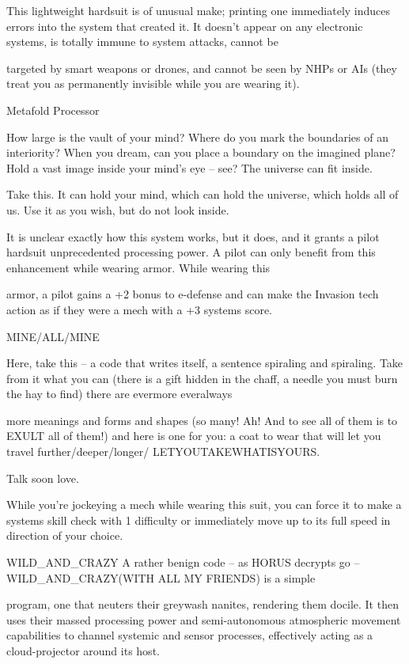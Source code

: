 This lightweight hardsuit is of unusual make; printing one immediately induces errors into the system that
created it. It doesn't appear on any electronic systems, is totally immune to system attacks, cannot be

targeted by smart weapons or drones, and cannot be seen by NHPs or AIs (they treat you as permanently
invisible while you are wearing it).


Metafold Processor




How large is the vault of your mind? Where do you mark the boundaries of an interiority? When you dream,
can you place a boundary on the imagined plane? Hold a vast image inside your mind's eye -- see? The
universe can fit inside.

Take this. It can hold your mind, which can hold the universe, which holds all of us. Use it as you wish, but
do not look inside.

It is unclear exactly how this system works, but it does, and it grants a pilot hardsuit unprecedented
processing power. A pilot can only benefit from this enhancement while wearing armor. While wearing this

armor, a pilot gains a +2 bonus to e-defense and can make the Invasion tech action as if they were a mech
with a +3 systems score.


MINE/ALL/MINE

Here, take this -- a code that writes itself, a sentence spiraling and spiraling. Take from it what you can
(there is a gift hidden in the chaff, a needle you must burn the hay to find) there are evermore everalways

more meanings and forms and shapes (so many! Ah! And to see all of them is to EXULT all of them!) and
here is one for you: a coat to wear that will let you travel further/deeper/longer/
LETYOUTAKEWHATISYOURS.

Talk soon love.

While you're jockeying a mech while wearing this suit, you can force it to make a systems skill check with
1 difficulty or immediately move up to its full speed in direction of your choice.


WILD\_AND\_CRAZY
A rather benign code -- as HORUS decrypts go -- WILD\_AND\_CRAZY(WITH ALL MY FRIENDS) is a simple

program, one that neuters their greywash nanites, rendering them docile. It then uses their massed
processing power and semi-autonomous atmospheric movement capabilities to channel systemic and
sensor processes, effectively acting as a cloud-projector around its host.

